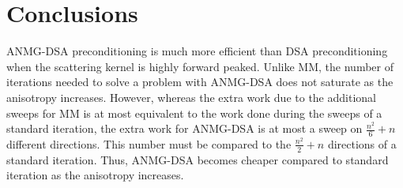 \section{Conclusions}
ANMG-DSA preconditioning is much more efficient than DSA preconditioning when
the scattering kernel is highly forward peaked. Unlike MM, the number of 
iterations needed to solve a problem with ANMG-DSA does not saturate as the 
anisotropy increases. However, whereas the extra work due to the additional
sweeps for MM is at most equivalent to the work done during the sweeps of a
standard iteration, the extra work for ANMG-DSA is at most a sweep on 
$\frac{n^2}{6}+n$ different directions. This number must be compared to the 
$\frac{n^2}{2}+n$ directions of a standard iteration. Thus, ANMG-DSA becomes 
cheaper compared to standard iteration as the anisotropy increases.
